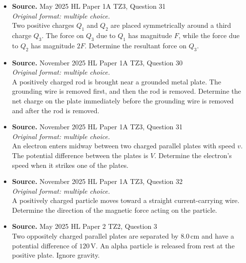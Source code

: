 \documentclass[11pt]{article}
\begin{document}
\begin{itemize}[leftmargin=1.25em]
\textit{Original format: multiple choice.}\\
Two isolated point charges, $+Q$ and $+2Q$, are separated by a distance $3d$. Point $P$ lies between them, at distance $d$ from the first charge and $2d$ from the second. Determine the net electric field strength at $P$.
\item
\textbf{Source.} May 2025 HL Paper 1A TZ3, Question 31\\
\textit{Original format: multiple choice.}\\
Two positive charges $Q_1$ and $Q_2$ are placed symmetrically around a third charge $Q_3$. The force on $Q_3$ due to $Q_1$ has magnitude $F$, while the force due to $Q_2$ has magnitude $2F$. Determine the resultant force on $Q_3$.
\item
\textbf{Source.} November 2025 HL Paper 1A TZ3, Question 30\\
\textit{Original format: multiple choice.}\\
A positively charged rod is brought near a grounded metal plate. The grounding wire is removed first, and then the rod is removed. Determine the net charge on the plate immediately before the grounding wire is removed and after the rod is removed.
\item
\textbf{Source.} November 2025 HL Paper 1A TZ3, Question 31\\
\textit{Original format: multiple choice.}\\
An electron enters midway between two charged parallel plates with speed $v$. The potential difference between the plates is $V$. Determine the electron's speed when it strikes one of the plates.
\item
\textbf{Source.} November 2025 HL Paper 1A TZ3, Question 32\\
\textit{Original format: multiple choice.}\\
A positively charged particle moves toward a straight current-carrying wire. Determine the direction of the magnetic force acting on the particle.
\item
\textbf{Source.} May 2025 HL Paper 2 TZ2, Question 3\\
Two oppositely charged parallel plates are separated by $8.0\,\text{cm}$ and have a potential difference of $120\,\text{V}$. An alpha particle is released from rest at the positive plate. Ignore gravity.


\end{itemize}
\end{document}
